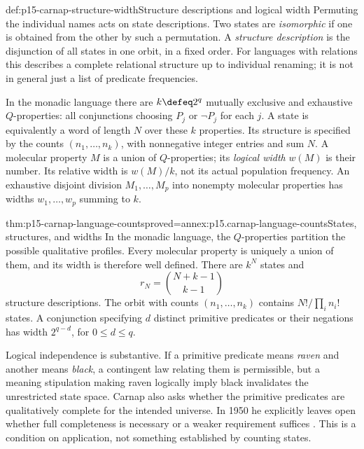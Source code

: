 \begin{hbdefinition}{def:p15-carnap-structure-width}{Structure descriptions and logical width}
Permuting the individual names acts on state descriptions. Two states
are \emph{isomorphic} if one is obtained from the other by such a
permutation. A \emph{structure description} is the disjunction of all
states in one orbit, in a fixed order. For languages with relations this
describes a complete relational structure up to individual renaming;
it is not in general just a list of predicate frequencies.

In the monadic language there are \(k\defeq2^q\) mutually exclusive
and exhaustive \(Q\)-properties: all conjunctions choosing \(P_j\)
or \(\neg P_j\) for each \(j\). A state is equivalently a word of
length \(N\) over these \(k\) properties. Its structure is specified
by the counts \((n_1,\ldots,n_k)\), with nonnegative integer entries
and sum \(N\). A molecular property \(M\) is a union of
\(Q\)-properties; its \emph{logical width} \(w(M)\) is their number.
Its relative width is \(w(M)/k\), not its actual population frequency.
An exhaustive disjoint division \(M_1,\ldots,M_p\) into nonempty
molecular properties has widths \(w_1,\ldots,w_p\) summing to \(k\).
\end{hbdefinition}

\begin{hbtheorem}{thm:p15-carnap-language-counts}{proved=annex:p15.carnap-language-counts}{States, structures, and widths}
In the monadic language, the \(Q\)-properties partition the possible
qualitative profiles. Every molecular property is uniquely a union of
them, and its width is therefore well defined. There are \(k^N\) states
and
\[
 r_N=\binom{N+k-1}{k-1}
\]
structure descriptions. The orbit with counts \((n_1,\ldots,n_k)\)
contains \(N!/\prod_i n_i!\) states. A conjunction specifying
\(d\) distinct primitive predicates or their negations has width
\(2^{q-d}\), for \(0\leq d\leq q\).
\end{hbtheorem}

Logical independence is substantive. If a primitive predicate means
\emph{raven} and another means \emph{black}, a contingent law relating
them is permissible, but a meaning stipulation making raven logically
imply black invalidates the unrestricted state space. Carnap also asks
whether the primitive predicates are qualitatively complete for the
intended universe. In 1950 he explicitly leaves open whether full
completeness is necessary or a weaker requirement suffices
\cite[sec.~18B, pp.~72--76]{Carnap1950Probability}. This is a
condition on application, not something established by counting states.

